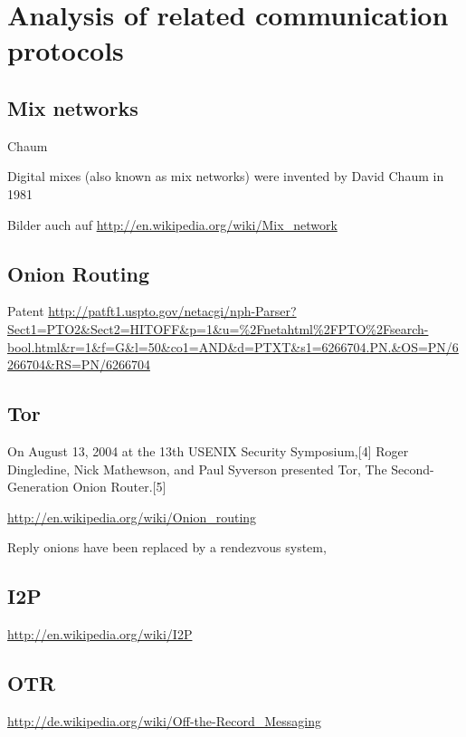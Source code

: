 \chapter{Analysis of related communication protocols}
\section{Mix networks}
Chaum


Digital mixes (also known as mix networks) were invented by David Chaum in 1981
\cite{Chaum:1981:UEM:358549.358563}

Bilder auch auf \url{http://en.wikipedia.org/wiki/Mix_network}


\section{Onion Routing}
Patent \url{http://patft1.uspto.gov/netacgi/nph-Parser?Sect1=PTO2&Sect2=HITOFF&p=1&u=%2Fnetahtml%2FPTO%2Fsearch-bool.html&r=1&f=G&l=50&co1=AND&d=PTXT&s1=6266704.PN.&OS=PN/6266704&RS=PN/6266704}
\section{Tor}
On August 13, 2004 at the 13th USENIX Security Symposium,[4] Roger Dingledine, Nick Mathewson, and Paul Syverson presented Tor, The Second-Generation Onion Router.[5]

\url{http://en.wikipedia.org/wiki/Onion_routing}

Reply onions have been replaced by a rendezvous system, 


\section{I2P}
\url{http://en.wikipedia.org/wiki/I2P}



\section{OTR}
\url{http://de.wikipedia.org/wiki/Off-the-Record_Messaging}
